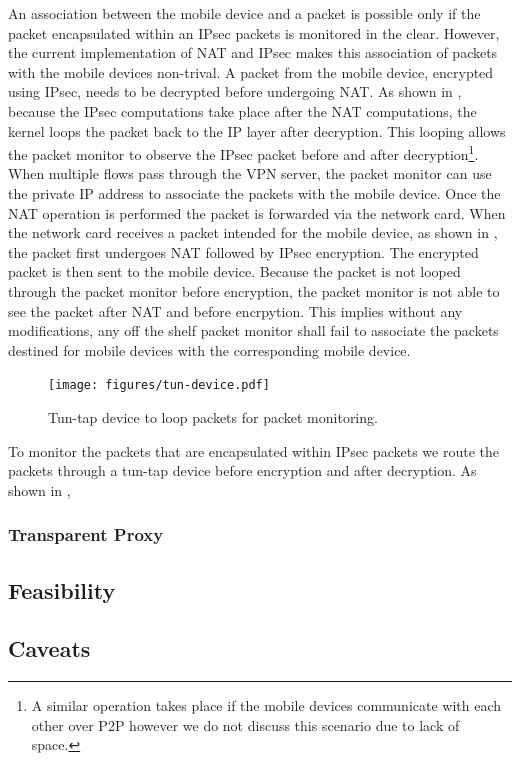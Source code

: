 An association between the mobile device and a packet is possible only if the packet encapsulated within an IPsec packets is monitored in the clear. 
However, the current implementation of NAT and IPsec makes this association of packets with the mobile devices non-trival.
A packet from the mobile device, encrypted using IPsec, needs to be decrypted before undergoing NAT. 
As shown in , because the IPsec computations take place after the NAT computations, the kernel loops the packet back to the IP layer after decryption.
This looping allows the packet monitor to observe the IPsec packet before and after decryption\footnote{A similar operation takes place if the mobile devices communicate with each other over P2P however we do not discuss this scenario due to lack of space.}.
When multiple flows pass through the VPN server, the packet monitor can use the private IP address to associate the packets with the mobile device. 
Once the NAT operation is performed the packet is forwarded via the network card.
When the network card receives a packet intended for the mobile device, as shown in , the packet first undergoes NAT followed by IPsec encryption. 
The encrypted packet is then sent to the mobile device. 
Because the packet is not looped through the packet monitor before encryption, the packet monitor is not able to see the packet after NAT and before encrpytion. 
This implies without any modifications, any off the shelf packet monitor shall fail to associate the packets destined for mobile devices with the corresponding mobile device. 

\begin{figure}
\begin{center}
\texttt{[image: figures/tun-device.pdf]}
\end{center}
\caption{Tun-tap device to loop packets for packet monitoring.}
\label{fig:packet-monitoring-solution}
\end{figure}

To monitor the packets that are encapsulated within IPsec packets we route the packets through a tun-tap device before encryption and after decryption. 
As shown in ,

\subsubsection{Transparent Proxy}
\label{sec:platform-transparent-proxy}


\subsection{Feasibility}


\subsection{Caveats}


